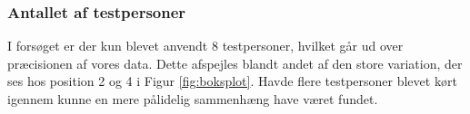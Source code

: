 \subsubsection{Antallet af testpersoner}
I forsøget er der kun blevet anvendt 8 testpersoner, hvilket går ud over præcisionen af vores data. Dette afspejles blandt andet af den store variation, der ses hos position 2 og 4 i Figur \ref{fig:boksplot}. Havde flere testpersoner blevet kørt igennem kunne en mere pålidelig sammenhæng have været fundet.




